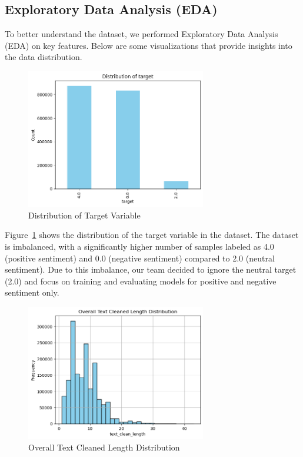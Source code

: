 \subsection{Exploratory Data Analysis (EDA)}

To better understand the dataset, we performed Exploratory Data Analysis (EDA) on key features. Below are some visualizations that provide insights into the data distribution.

\begin{figure}[H]
    \centering
    \includegraphics[width=0.7\textwidth]{img/dataset/distribution_target.png}
    \caption{Distribution of Target Variable}
    \label{fig:distribution-target}
\end{figure}

Figure~\ref{fig:distribution-target} shows the distribution of the target variable in the dataset. The dataset is imbalanced, with a significantly higher number of samples labeled as 4.0 (positive sentiment) and 0.0 (negative sentiment) compared to 2.0 (neutral sentiment). Due to this imbalance, our team decided to ignore the neutral target (2.0) and focus on training and evaluating models for positive and negative sentiment only.

\begin{figure}[H]
    \centering
    \includegraphics[width=0.7\textwidth]{img/dataset/distribution_text_clean_length.png}
    \caption{Overall Text Cleaned Length Distribution}
    \label{fig:distribution-clean-length}
\end{figure}

